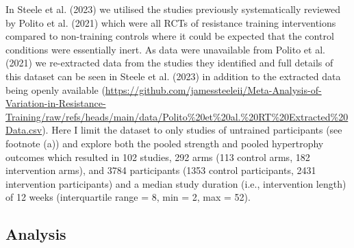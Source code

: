 \documentclass[
]{article}
\begin{document}
In Steele et al. (2023) we utilised the studies previously
systematically reviewed by Polito et al. (2021) which were all RCTs of
resistance training interventions compared to non-training controls
where it could be expected that the control conditions were essentially
inert. As data were unavailable from Polito et al. (2021) we
re-extracted data from the studies they identified and full details of
this dataset can be seen in Steele et al. (2023) in addition to the
extracted data being openly available
(\url{https://github.com/jamessteeleii/Meta-Analysis-of-Variation-in-Resistance-Training/raw/refs/heads/main/data/Polito\%20et\%20al.\%20RT\%20Extracted\%20Data.csv}).
Here I limit the dataset to only studies of untrained participants (see
footnote (a)) and explore both the pooled strength and pooled
hypertrophy outcomes which resulted in 102 studies, 292 arms (113
control arms, 182 intervention arms), and 3784 participants (1353
control participants, 2431 intervention participants) and a median study
duration (i.e., intervention length) of 12 weeks (interquartile range =
8, min = 2, max = 52).

\subsection{Analysis}\label{analysis}
\end{document}
